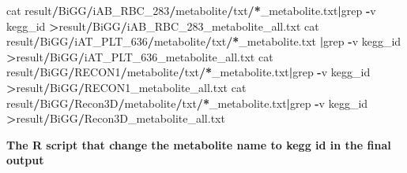 \documentclass[
]{book}
\newenvironment{Shaded}{\begin{snugshade}}{\end{snugshade}}
\newcommand{\ErrorTok}[1]{\textcolor[rgb]{0.64,0.00,0.00}{\textbf{#1}}}
\newcommand{\NormalTok}[1]{#1}
\newcommand{\SpecialCharTok}[1]{\textcolor[rgb]{0.81,0.36,0.00}{\textbf{#1}}}
\begin{document}
\begin{Shaded}
\begin{Highlighting}[]
\NormalTok{cat result}\SpecialCharTok{/}\NormalTok{BiGG}\SpecialCharTok{/}\NormalTok{iAB\_RBC\_283}\SpecialCharTok{/}\NormalTok{metabolite}\SpecialCharTok{/}\NormalTok{txt}\SpecialCharTok{/}\ErrorTok{*}\NormalTok{\_metabolite.txt}\SpecialCharTok{|}\NormalTok{grep }\SpecialCharTok{{-}}\NormalTok{v kegg\_id }\SpecialCharTok{\textgreater{}}\NormalTok{result}\SpecialCharTok{/}\NormalTok{BiGG}\SpecialCharTok{/}\NormalTok{iAB\_RBC\_283\_metabolite\_all.txt}
\NormalTok{cat result}\SpecialCharTok{/}\NormalTok{BiGG}\SpecialCharTok{/}\NormalTok{iAT\_PLT\_636}\SpecialCharTok{/}\NormalTok{metabolite}\SpecialCharTok{/}\NormalTok{txt}\SpecialCharTok{/}\ErrorTok{*}\NormalTok{\_metabolite.txt }\SpecialCharTok{|}\NormalTok{grep }\SpecialCharTok{{-}}\NormalTok{v kegg\_id }\SpecialCharTok{\textgreater{}}\NormalTok{result}\SpecialCharTok{/}\NormalTok{BiGG}\SpecialCharTok{/}\NormalTok{iAT\_PLT\_636\_metabolite\_all.txt}
\NormalTok{cat result}\SpecialCharTok{/}\NormalTok{BiGG}\SpecialCharTok{/}\NormalTok{RECON1}\SpecialCharTok{/}\NormalTok{metabolite}\SpecialCharTok{/}\NormalTok{txt}\SpecialCharTok{/}\ErrorTok{*}\NormalTok{\_metabolite.txt}\SpecialCharTok{|}\NormalTok{grep }\SpecialCharTok{{-}}\NormalTok{v kegg\_id }\SpecialCharTok{\textgreater{}}\NormalTok{result}\SpecialCharTok{/}\NormalTok{BiGG}\SpecialCharTok{/}\NormalTok{RECON1\_metabolite\_all.txt}
\NormalTok{cat result}\SpecialCharTok{/}\NormalTok{BiGG}\SpecialCharTok{/}\NormalTok{Recon3D}\SpecialCharTok{/}\NormalTok{metabolite}\SpecialCharTok{/}\NormalTok{txt}\SpecialCharTok{/}\ErrorTok{*}\NormalTok{\_metabolite.txt}\SpecialCharTok{|}\NormalTok{grep }\SpecialCharTok{{-}}\NormalTok{v kegg\_id }\SpecialCharTok{\textgreater{}}\NormalTok{result}\SpecialCharTok{/}\NormalTok{BiGG}\SpecialCharTok{/}\NormalTok{Recon3D\_metabolite\_all.txt}
\end{Highlighting}
\end{Shaded}

\textbf{The R script that change the metabolite name to kegg id in the final output}
\end{document}

